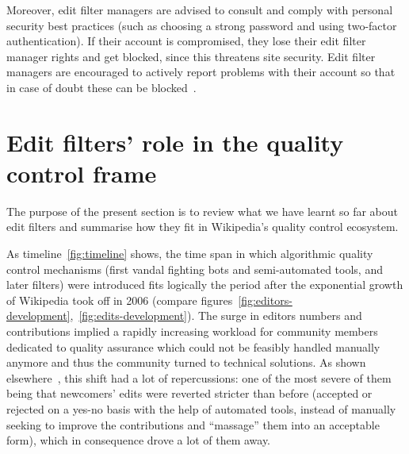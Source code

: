 Moreover, edit filter managers are advised to consult and comply with personal security best practices (such as choosing a strong password and using two-factor authentication).
If their account is compromised, they lose their edit filter manager rights and get blocked, since this threatens site security.
Edit filter managers are encouraged to actively report problems with their account so that in case of doubt these can be blocked~\cite{Wikipedia:EditFilter}.


\section{Edit filters' role in the quality control frame}

The purpose of the present section is to review what we have learnt so far about edit filters and summarise how they fit in Wikipedia's quality control ecosystem.

As timeline~\ref{fig:timeline} shows, the time span in which algorithmic quality control mechanisms (first vandal fighting bots and semi-automated tools, and later filters) were introduced fits logically the period after the exponential growth of Wikipedia took off in 2006 (compare figures~\ref{fig:editors-development},~\ref{fig:edits-development}).
The surge in editors numbers and contributions implied a rapidly increasing workload for community members dedicated to quality assurance
which could not be feasibly handled manually anymore and thus the community turned to technical solutions.
As shown elsewhere~\cite{HalGeiMorRied2013}, this shift had a lot of repercussions:
one of the most severe of them being that newcomers' edits were reverted stricter than before (accepted or rejected on a yes-no basis with the help of automated tools, instead of manually seeking to improve the contributions and ``massage'' them into an acceptable form), which in consequence drove a lot of them away.

